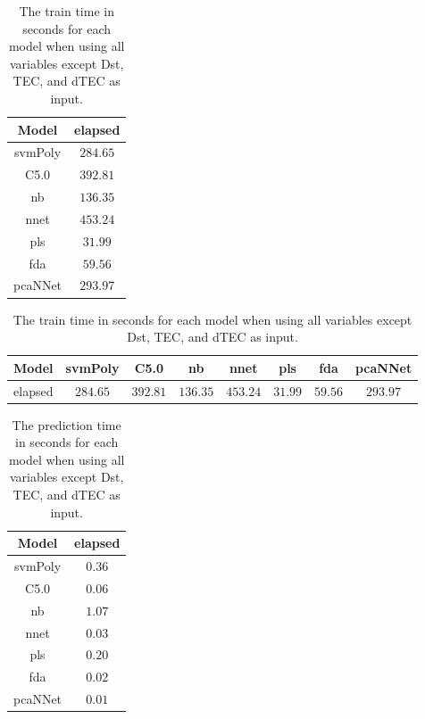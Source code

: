 \begin{table}[!ht]
	\centering
	\begin{tabular}{|c|c|}
		\hline
		Model & elapsed \\ \hline
		svmPoly & $284.65$ \\ \hline
		C5.0 & $392.81$ \\ \hline
		nb & $136.35$ \\ \hline
		nnet & $453.24$ \\ \hline
		pls & $31.99$ \\ \hline
		fda & $59.56$ \\ \hline
		pcaNNet & $293.97$ \\ \hline
	\end{tabular}
	\caption{The train time in seconds for each model when using all variables except Dst, TEC, and dTEC as input.}
	\label{tab:time:noTEC:train}
\end{table}

\begin{table}[!ht]
	\centering
	\begin{tabular}{|c|c|c|c|c|c|c|c|}
		\hline
		Model & svmPoly & C5.0 & nb & nnet & pls & fda & pcaNNet \\ \hline
		elapsed & $284.65$ & $392.81$ & $136.35$ & $453.24$ & $31.99$ & $59.56$ & $293.97$ \\ \hline
	\end{tabular}
	\caption{The train time in seconds for each model when using all variables except Dst, TEC, and dTEC as input.}
	\label{tab:time:reverse:noTEC:train}
\end{table}

\begin{table}[!ht]
	\centering
	\begin{tabular}{|c|c|}
		\hline
		Model & elapsed \\ \hline
		svmPoly & $0.36$ \\ \hline
		C5.0 & $0.06$ \\ \hline
		nb & $1.07$ \\ \hline
		nnet & $0.03$ \\ \hline
		pls & $0.20$ \\ \hline
		fda & $0.02$ \\ \hline
		pcaNNet & $0.01$ \\ \hline
	\end{tabular}
	\caption{The prediction time in seconds for each model when using all variables except Dst, TEC, and dTEC as input.}
	\label{tab:time:noTEC:predict}
\end{table}

